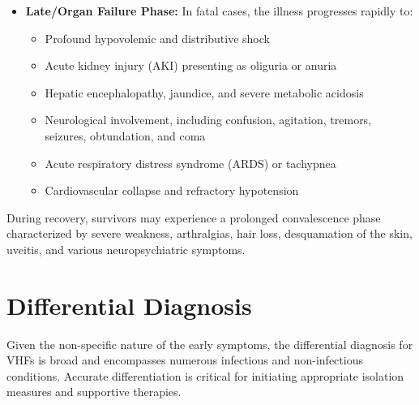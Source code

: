 \begin{itemize}
\begin{itemize}
  \item Postural hypotension, tachycardia, and signs of plasma leakage (ascites, pleural effusion, and generalized edema)
  \item Maculopapular rash, particularly prominent in filovirus infections, appearing on the trunk and spreading to the extremities
  \end{itemize}
\item \textbf{Late/Organ Failure Phase:} In fatal cases, the illness progresses rapidly to:
  \begin{itemize}
  \item Profound hypovolemic and distributive shock
  \item Acute kidney injury (AKI) presenting as oliguria or anuria
  \item Hepatic encephalopathy, jaundice, and severe metabolic acidosis
  \item Neurological involvement, including confusion, agitation, tremors, seizures, obtundation, and coma
  \item Acute respiratory distress syndrome (ARDS) or tachypnea
  \item Cardiovascular collapse and refractory hypotension
  \end{itemize}
\end{itemize}

During recovery, survivors may experience a prolonged convalescence phase characterized by severe weakness, arthralgias, hair loss, desquamation of the skin, uveitis, and various neuropsychiatric symptoms.

\section*{Differential Diagnosis}
Given the non-specific nature of the early symptoms, the differential diagnosis for VHFs is broad and encompasses numerous infectious and non-infectious conditions. Accurate differentiation is critical for initiating appropriate isolation measures and supportive therapies.

